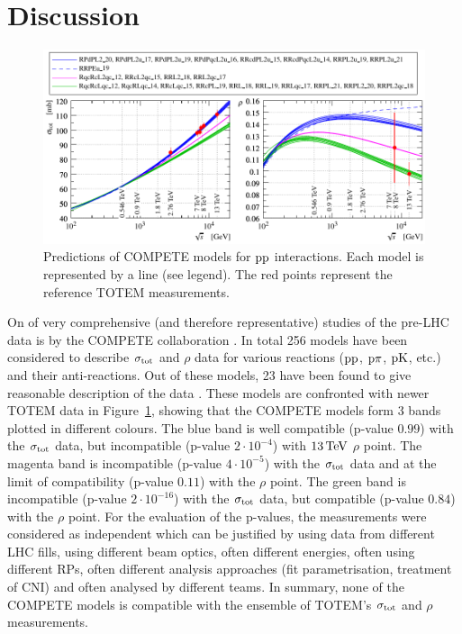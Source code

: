 \section{Discussion}
\label{sec:discussion}

\begin{figure}
\vskip-5mm
\begin{center}
\includegraphics{fig/compete_bands_si_tot_rho.pdf}
\caption{%
Predictions of COMPETE models \cite{compete-details} for $\rm pp$ interactions. Each model is represented by a line (see legend). The red points represent the reference TOTEM measurements. 
}
\label{fig:comp bands}
\end{center}
\end{figure}

On of very comprehensive (and therefore representative) studies of the pre-LHC data is by the COMPETE collaboration \cite{compete}. In total 256 models have been considered to describe $\sigma_{\rm tot}$ and $\rho$ data for various reactions ($\rm pp$, $\rm p\pi$, $\rm pK$, etc.) and their anti-reactions. Out of these models, 23 have been found to give reasonable description of the data \cite{compete-details}. These models are confronted with newer TOTEM data in Figure~\ref{fig:comp bands}, showing that the COMPETE models form 3 bands plotted in different colours. The blue band is well compatible (p-value $0.99$) with the $\sigma_{\rm tot}$ data, but incompatible (p-value $2\cdot10^{-4}$) with $13\,{\rm TeV}$ $\rho$ point. The magenta band is incompatible (p-value $4\cdot10^{-5}$) with the $\sigma_{\rm tot}$ data and at the limit of compatibility (p-value $0.11$) with the $\rho$ point. The green band is incompatible (p-value $2\cdot10^{-16}$) with the $\sigma_{\rm tot}$ data, but compatible (p-value $0.84$) with the $\rho$ point. For the evaluation of the p-values, the measurements were considered as independent which can be justified by using data from different LHC fills, using different beam optics, often different energies, often using different RPs, often different analysis approaches (fit parametrisation, treatment of CNI) and often analysed by different teams. In summary, none of the COMPETE models is compatible with the ensemble of TOTEM's $\sigma_{\rm tot}$ and $\rho$ measurements.


